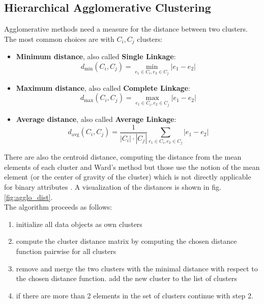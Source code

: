 \subsection{Hierarchical Agglomerative Clustering}\label{\positionnumber}
Agglomerative methods need a measure for the distance between two clusters. The most common choices are with $C_i, C_j$ clusters:
\begin{itemize}
    \item \textbf{Minimum distance}, also called \textbf{Single Linkage}: 
    \[d_{\text{min}}(C_i, C_j) = \min_{e_1 \in C_i, e_2 \in C_j} |e_1 - e_2|\]
    \item \textbf{Maximum distance}, also called \textbf{Complete Linkage}: 
    \[d_{\text{max}}(C_i, C_j) = \max_{e_1 \in C_i, e_2 \in C_j} |e_1 - e_2|\]
    \item \textbf{Average distance}, also called \textbf{Average Linkage}: 
    \[d_{\text{avg}}(C_i, C_j) = \frac{1}{|C_i| \cdot |C_j|} \sum_{e_1 \in C_i, e_2 \in C_j} |e_1 - e_2|\]
\end{itemize}
There are also the centroid distance, computing the distance from the mean elements of each cluster and Ward's method but those use the notion of the mean element (or the center of gravity of the cluster) which is not directly applicable for binary attributes \cite{mirkin2013mathematical, han2011data}. A visualization of the distances is shown in fig. \ref{fig:agglo_dist}.
 \\
The algorithm proceeds as follows: 
\begin{enumerate}
    \item initialize all data objects as own clusters
    \item compute the cluster distance matrix by computing the chosen distance function pairwise for all clusters
    \item remove and merge the two clusters with the minimal distance with respect to the chosen distance function. add the new cluster to the list of clusters
    \item if there are more than 2 elements in the set of clusters continue with step 2. 
\end{enumerate}

